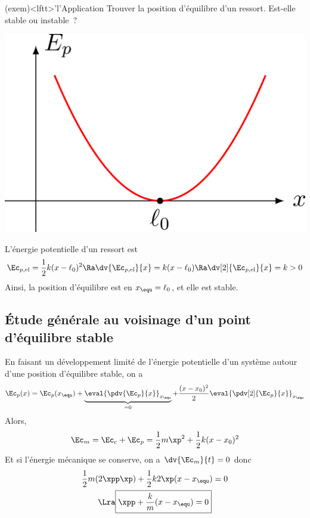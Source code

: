 \documentclass[../../main/main.tex]{subfiles}
\begin{document}
\begin{tcb*}(exem)<lftt>'l'{Application}
	Trouver la position d'équilibre d'un ressort. Est-elle stable ou instable~?
	\tcblower
	\begin{minipage}{0.25\linewidth}
		\begin{center}
			\includegraphics[width=\linewidth]{stab_ressort}
		\end{center}
	\end{minipage}
	\hfill
	\begin{minipage}{0.70\linewidth}
		L'énergie potentielle d'un ressort est
		\[
			\Ec_{p,\rm el} = \frac{1}{2}k(x-\ell_0)^2
			\Ra
			\dv{\Ec_{p,\rm el}}{x} = k(x-\ell_0)
			\Ra
			\dv[2]{\Ec_{p,\rm el}}{x} = k > 0
		\]
		Ainsi, la position d'équilibre est en $x_{\equ} = \ell_0$, et elle est
		stable.
	\end{minipage}
\end{tcb*}

\subsection{Étude générale au voisinage d'un point d'équilibre stable}
En faisant un développement limité de l'énergie potentielle d'un système autour
d'une position d'équilibre stable, on a
\begin{gather*}
	\Ec_p(x) = \Ec_p(x_{\equ}) +
	\underbrace{\eval{\pdv{\Ec_p}{x}}_{x_{\equ}}}_{=0} +
	\frac{(x-x_0)^2}{2}\eval{\pdv[2]{\Ec_p}{x}}_{x_{\equ}}
\end{gather*}
\smallbreak\noindent
Alors,
\[\Ec_m = \Ec_c + \Ec_p = \frac{1}{2}m\xp^2 + \frac{1}{2}k(x-x_0)^2\]
Et si l'énergie mécanique se conserve, on a $\dv{\Ec_m}{t} = 0$ donc
\begin{gather*}
	\frac{1}{2}m(2\xpp\xp) + \frac{1}{2}k 2\xp(x-x_{\equ}) = 0
	\\\Lra
	\boxed{\xpp + \frac{k}{m}(x-x_{\equ}) = 0}
\end{gather*}
\end{document}
